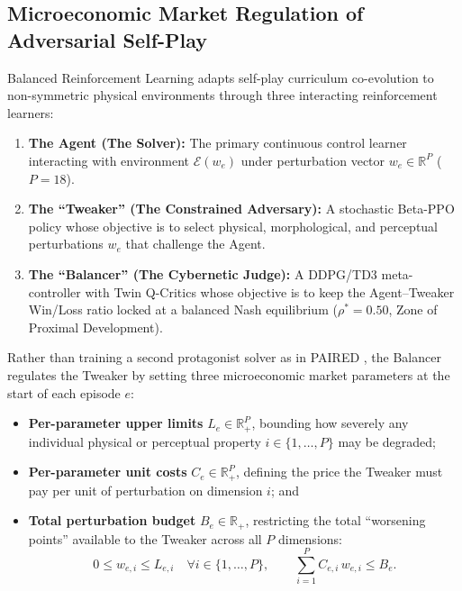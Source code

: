 \documentclass[11pt,a4paper]{article}
\begin{document}
\subsection{Microeconomic Market Regulation of Adversarial Self-Play}
Balanced Reinforcement Learning adapts self-play curriculum co-evolution to non-symmetric physical environments through three interacting reinforcement learners:
\begin{enumerate}
    \item \textbf{The Agent (The Solver):} The primary continuous control learner interacting with environment $\mathcal{E}(w_e)$ under perturbation vector $w_e \in \mathbb{R}^P$ ($P = 18$).
    \item \textbf{The ``Tweaker'' (The Constrained Adversary):} A stochastic Beta-PPO policy \cite{schulman2017proximal} whose objective is to select physical, morphological, and perceptual perturbations $w_e$ that challenge the Agent.
    \item \textbf{The ``Balancer'' (The Cybernetic Judge):} A DDPG/TD3 meta-controller \cite{lillicrap2015continuous,fujimoto2018addressing} with Twin Q-Critics whose objective is to keep the Agent--Tweaker Win/Loss ratio locked at a balanced Nash equilibrium ($\rho^* = 0.50$, Zone of Proximal Development).
\end{enumerate}

Rather than training a second protagonist solver as in PAIRED \cite{dennis2020emergent}, the Balancer regulates the Tweaker by setting three microeconomic market parameters at the start of each episode $e$:
\begin{itemize}
    \item \textbf{Per-parameter upper limits} $L_e \in \mathbb{R}_+^P$, bounding how severely any individual physical or perceptual property $i \in \{1, \dots, P\}$ may be degraded;
    \item \textbf{Per-parameter unit costs} $C_e \in \mathbb{R}_+^P$, defining the price the Tweaker must pay per unit of perturbation on dimension $i$; and
    \item \textbf{Total perturbation budget} $B_e \in \mathbb{R}_+$, restricting the total ``worsening points'' available to the Tweaker across all $P$ dimensions:
    \begin{equation}
        0 \le w_{e,i} \le L_{e,i} \quad \forall i \in \{1, \dots, P\}, \qquad \sum_{i=1}^P C_{e,i}\, w_{e,i} \le B_e.
    \end{equation}
\end{itemize}
\end{document}
